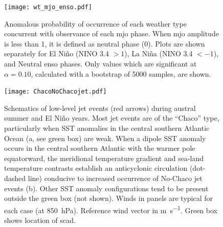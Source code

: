\documentclass{ametsoc}
\begin{document}
\begin{figure}
	\texttt{[image: wt\_mjo\_enso.pdf]}
	\caption{
		Anomalous probability of occurrence of each weather type concurrent with observance of each \gls{mjo} phase.
		When \gls{mjo} amplitude is less than 1, it is defined as neutral phase (0).
		Plots are shown separately for El Ni\~no (NINO 3.4 $>1$), La Ni\~na (NINO 3.4 $< -1$), and Neutral \gls{enso} phases.
		Only values which are significant at $\alpha=0.10$, calculated with a bootstrap of 5000 samples, are shown.
	}\label{fig:wt-mjo-enso}
\end{figure}

\begin{figure}
	\noindent\texttt{[image: ChacoNoChacojet.pdf]}
	\caption{
		Schematics of low-level jet events (red arrows) during austral summer and El Ni\~no years.
		Most jet events are of the ``Chaco'' type, particularly when SST anomalies in the central southern Atlantic Ocean (a, see green box) are weak.
		When a dipole SST anomaly occurs in the central southern Atlantic with the warmer pole equatorward, the meridional temperature gradient and sea-land temperature contrasts establish an anticyclonic circulation (dot-dashed line) conducive to increased occurrence of No-Chaco jet events (b).
		Other SST anomaly configurations tend to be present outside the green box (not shown).
		Winds in panels are typical for each case (at \SI{850}{\hecto\pascal}).
		Reference wind vector in \si{\meter\per\second}.
		Green box shows location of \gls{scad}.
	}\label{fig:chaco-nochaco}
\end{figure}
\end{document}
